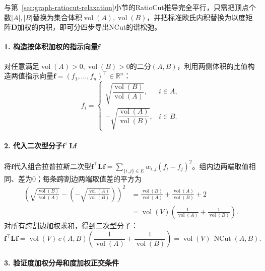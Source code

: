 与第~\ref{sec:graph-ratiocut-relaxation}小节的RatioCut推导完全平行，只需把顶点个数$|A|,|B|$替换为集合体积$\operatorname{vol}(A),\operatorname{vol}(B)$，并把标准欧氏内积替换为以度矩阵$\bm D$加权的内积，即可分四步导出NCut的谱松弛。

\paragraph{1. 构造按体积加权的指示向量$\bm f$}

对任意满足$\operatorname{vol}(A)>0,\operatorname{vol}(B)>0$的二分$(A,B)$，利用两侧体积的比值构造两值指示向量$\bm f=(f_1,\ldots,f_n)^\top\in\mathbb R^n$：
\begin{equation}
\label{eq:ncut-indicator-vector}
  f_i = \begin{cases}
    \sqrt{\dfrac{\operatorname{vol}(B)}{\operatorname{vol}(A)}}, & i\in A,\\[10pt]
    -\sqrt{\dfrac{\operatorname{vol}(A)}{\operatorname{vol}(B)}}, & i\in B.
  \end{cases}
\end{equation}

\paragraph{2. 代入二次型分子$\bm f^\top\bm L\bm f$}

将$\bm f$代入组合拉普拉斯二次型$\bm f^\top\bm L\bm f=\sum_{\{i,j\}\in E}w_{i,j}(f_i-f_j)^2$。组内边两端取值相同、差为$0$；每条跨割边两端取值差的平方为
\[
\begin{aligned}
  \left(\sqrt{\frac{\operatorname{vol}(B)}{\operatorname{vol}(A)}} - \left(-\sqrt{\frac{\operatorname{vol}(A)}{\operatorname{vol}(B)}}\right)\right)^{\!2}
  &= \frac{\operatorname{vol}(B)}{\operatorname{vol}(A)} + \frac{\operatorname{vol}(A)}{\operatorname{vol}(B)} + 2 \\
  &= \operatorname{vol}(V)\left(\frac{1}{\operatorname{vol}(A)}+\frac{1}{\operatorname{vol}(B)}\right).
\end{aligned}
\]
对所有跨割边加权求和，得到二次型分子：
\begin{equation}
\label{eq:ncut-quadratic-numerator}
  \bm f^\top\bm L\bm f = \operatorname{vol}(V)\,c(A,B)\left(\frac{1}{\operatorname{vol}(A)}+\frac{1}{\operatorname{vol}(B)}\right)
  = \operatorname{vol}(V)\,\operatorname{NCut}(A,B).
\end{equation}

\paragraph{3. 验证度加权分母和度加权正交条件}

